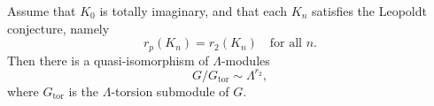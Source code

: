 Assume that $K_0$ is totally imaginary, and that each $K_n$ satisfies the Leopoldt conjecture, namely
$$r_p(K_n) = r_2(K_n) \quad \text{for all } n.$$
Then there is a quasi-isomorphism of $\Lambda$-modules
$$G/G_{\mathrm{tor}} \sim \Lambda^{r_2},$$
where $G_{\mathrm{tor}}$ is the $\Lambda$-torsion submodule of $G$.